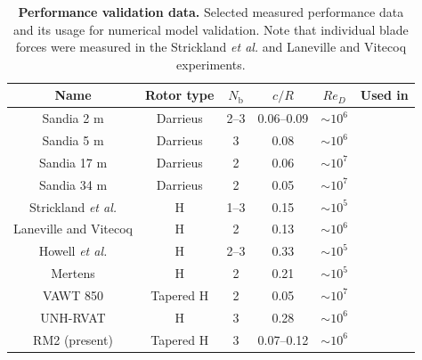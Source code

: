 \documentclass[10pt,letterpaper]{article}
\begin{document}
\begin{table}
    \centering

    \begin{tabular}{c|c|c|c|c|c}
        Name & Rotor type & $N_\mathrm{b}$ & $c/R$ & $Re_D$ & Used in \\
        \hline
        Sandia 2 m \cite{Blackwell1976} &  Darrieus  & 2--3 & 0.06--0.09 & $\sim 10^6$ & \cite{Roh2013,Bedon2014} \\
        Sandia 5 m \cite{Sheldahl1977} &  Darrieus  & 3 & 0.08 & $\sim 10^6$ & \cite{Antheaume2008,Bedon2014} \\
        Sandia 17 m \cite{Worstell1978} & Darrieus  & 2 & 0.06 & $\sim 10^7$ & \cite{Para1988,Orlandi2015,Bedon2014} \\
        Sandia 34 m \cite{Ashwill1992} & Darrieus  & 2 & 0.05 & $\sim 10^7$ & \cite{Liu1992,Murray2011,Bedon2014}  \\
        Strickland \emph{et al.} \cite{Strickland1981} & H & 1--3 & 0.15 & $\sim 10^5$ & \cite{Ponta2001,Scheurich2011b} \\
        Laneville and Vitecoq \cite{Laneville1986} & H & 2 & 0.13 & $\sim 10^6$ & \cite{Amet2009} \\
        Howell \emph{et al.} \cite{Howell2010} & H & 2--3 & 0.33 & $\sim 10^5$ & \cite{Joo2015} \\
        Mertens \cite{Mertens2003} & H & 2 & 0.21 & $\sim 10^5$ & \cite{Orlandi2015} \\
        VAWT 850 \cite{Mays1990} & Tapered H & 2 & 0.05 & $\sim 10^7$ & \cite{Murray2011} \\
        UNH-RVAT \cite{Bachant2014-RVAT-baseline} & H & 3 & 0.28 & $\sim 10^6$ & \cite{Michelen2014} \\
        RM2 (present) & Tapered H & 3 & 0.07--0.12 & $\sim 10^6$ &
    \end{tabular}

    \caption{\textbf{Performance validation data.} Selected measured performance
        data and its usage for numerical model validation. Note that individual
        blade forces were measured in the Strickland \emph{et al.} and Laneville and
        Vitecoq experiments.}

    \label{tab:validation-data}
\end{table}
\end{document}
